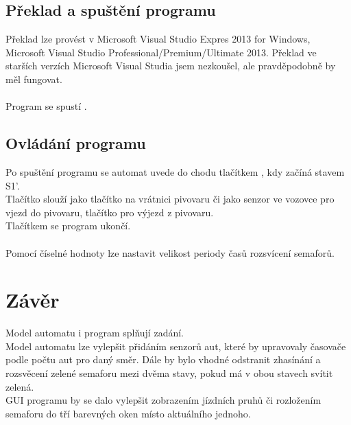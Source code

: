 \documentclass[12pt, a4paper]{report}
\begin{document}
\section{Překlad a spuštění programu}
Překlad lze provést v Microsoft Visual Studio Expres 2013 for Windows, Microsoft Visual Studio Professional/Premium/Ultimate 2013. Překlad ve starších verzích Microsoft Visual Studia jsem nezkoušel, ale pravděpodobně by měl fungovat.\\
\\
Program se spustí .

\section{Ovládání programu}
Po spuštění programu se automat uvede do chodu tlačítkem , kdy začíná stavem S1'.\\
Tlačítko  slouží jako tlačítko na vrátnici pivovaru či jako senzor ve vozovce pro vjezd do pivovaru, tlačítko  pro výjezd z pivovaru.\\
Tlačítkem  se program ukončí.\\
\\
Pomocí číselné hodnoty lze nastavit velikost periody časů rozsvícení semaforů.




\chapter{Závěr}

Model automatu i program splňují zadání.\\
Model automatu lze vylepšit přidáním senzorů aut, které by upravovaly časovače podle počtu aut pro daný směr. Dále by bylo vhodné odstranit zhasínání a rozsvěcení zelené semaforu mezi dvěma stavy, pokud má v obou stavech svítit zelená.\\
GUI programu by se dalo vylepšit zobrazením jízdních pruhů či rozložením semaforu do tří barevných oken místo aktuálního jednoho.
\end{document}
